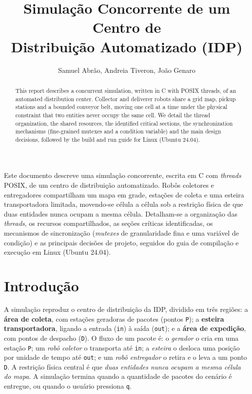 \documentclass[12pt]{article}
\title{Simulação Concorrente de um Centro de\\ Distribuição Automatizado (IDP)}
\author{Samuel Abrão\inst{1}, Andreia Tiveron\inst{1}, João Genaro\inst{1}}
\begin{document}
\maketitle

\begin{abstract}
This report describes a concurrent simulation, written in C with POSIX threads,
of an automated distribution center. Collector and deliverer robots share a
grid map, pickup stations and a bounded conveyor belt, moving one cell at a time
under the physical constraint that two entities never occupy the same cell. We
detail the thread organization, the shared resources, the identified critical
sections, the synchronization mechanisms (fine-grained mutexes and a condition
variable) and the main design decisions, followed by the build and run guide for
Linux (Ubuntu 24.04).
\end{abstract}

\begin{resumo}
Este documento descreve uma simulação concorrente, escrita em C com \textit{threads}
POSIX, de um centro de distribuição automatizado. Robôs coletores e entregadores
compartilham um mapa em grade, estações de coleta e uma esteira transportadora
limitada, movendo-se célula a célula sob a restrição física de que duas entidades
nunca ocupam a mesma célula. Detalham-se a organização das \textit{threads}, os
recursos compartilhados, as seções críticas identificadas, os mecanismos de
sincronização (\textit{mutexes} de granularidade fina e uma variável de condição)
e as principais decisões de projeto, seguidos do guia de compilação e execução em
Linux (Ubuntu 24.04).
\end{resumo}

\section{Introdução}

A simulação reproduz o centro de distribuição da IDP, dividido em três regiões:
a \textbf{área de coleta}, com estações geradoras de pacotes (pontos \texttt{P});
a \textbf{esteira transportadora}, ligando a entrada (\texttt{in}) à saída
(\texttt{out}); e a \textbf{área de expedição}, com pontos de despacho
(\texttt{D}). O fluxo de um pacote é: o \emph{gerador} o cria em uma estação
\texttt{P}; um \emph{robô coletor} o transporta até \texttt{in}; a \emph{esteira}
o desloca uma posição por unidade de tempo até \texttt{out}; e um \emph{robô
entregador} o retira e o leva a um ponto \texttt{D}. A restrição física central é
que \emph{duas entidades nunca ocupam a mesma célula do mapa}. A simulação termina
quando a quantidade de pacotes do cenário é entregue, ou quando o usuário pressiona
\texttt{q}.
\end{document}

